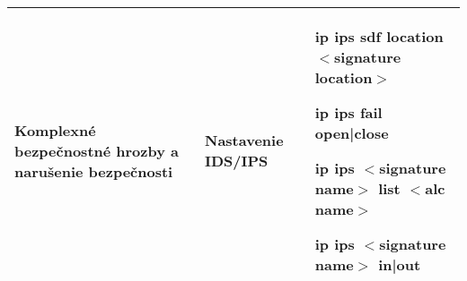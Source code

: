 \begin{longtable}[!htbp]{|L{10em}L{10em}>{\selectfont}L{34em}|}
	
	
	Komplexné bezpečnostné hrozby a narušenie bezpečnosti	&Nastavenie IDS/IPS	&ip ips sdf location $<$signature location$>$
	
	ip ips fail  open|close
	
	ip ips $<$signature name$>$ list $<$alc name$>$
	
	ip ips $<$signature name$>$ in|out\\
	
	
	\hline
	
\end{longtable}%



\restoregeometry
\normalsize

